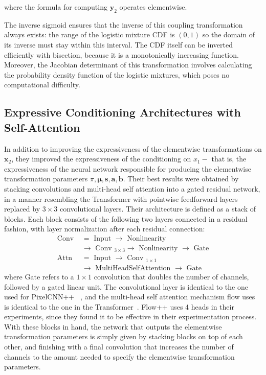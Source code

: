 \documentclass[]{IEEEtran}
\begin{document}
where the formula for computing $\mathbf{y}_{2}$ operates elementwise.

The inverse sigmoid ensures that the inverse of this coupling transformation always exists: the range of the logistic mixture CDF is $(0,1)$ so the domain of its inverse must stay within this interval. The CDF itself can be inverted efficiently with bisection, because it is a monotonically increasing function. Moreover, the Jacobian determinant of this transformation involves calculating the probability density function of the logistic mixtures, which poses no computational difficulty.


\subsection{ Expressive Conditioning Architectures  with Self-Attention }
In addition to improving the expressiveness of the elementwise transformations on $\mathbf{x}_{2}$, they improved the expressiveness of the conditioning on $x_{1}-$ that is, the expressiveness of the neural network responsible for producing the elementwise transformation parameters $\pi, \boldsymbol{\mu}, \mathbf{s}, \mathbf{a}, \mathbf{b}$. Their best results were obtained by stacking convolutions and multi-head self attention into a gated residual network, in a manner resembling the Transformer with pointwise feedforward layers replaced by $3 \times 3$ convolutional layers. Their architecture is defined as a stack of blocks. Each block consists of the following two layers connected in a residual fashion, with layer normalization after each residual connection:
\[
\begin{aligned}
\text { Conv } &=\text { Input } \rightarrow \text { Nonlinearity } \\
& \rightarrow \text { Conv }_{3 \times 3} \rightarrow \text { Nonlinearity } \rightarrow \text { Gate } \\
\text { Attn } &=\text { Input } \rightarrow \text { Conv }_{1 \times 1} \\
& \rightarrow \text { MultiHeadSelfAttention } \rightarrow \text { Gate }
\end{aligned}
\]
where Gate refers to a $1 \times 1$ convolution that doubles the number of channels, followed by a gated linear unit. The convolutional layer is identical to the one used for PixelCNN++ ~\cite{NIPS2016_6114}, and the multi-head self attention mechanism flow uses is identical to the one in the Transformer~\cite{NIPS2017_7181}. Flow++ uses 4 heads in their experiments, since they found it to be effective in their experimentation process.
With these blocks in hand, the network that outputs the elementwise transformation parameters is simply given by stacking blocks on top of each other, and finishing with a final convolution that increases the number of channels to the amount needed to specify the elementwise transformation parameters.
\end{document}
